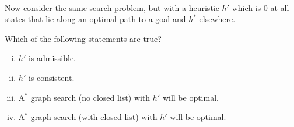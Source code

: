 \begin{enumerate}
\begin{enumerate}[(i)]
\fbox{\begin{minipage}[t][2.5cm][t]{13cm} \AnswerOneD \end{minipage}}\\
\end{enumerate}





Now consider the same search problem, but with a heuristic $h'$ which is 0 at all states that lie along an optimal path to a goal and $h^*$ elsewhere.


 Which of the following statements are true?\\
\begin{enumerate}[(i)]
\item $h'$ is admissible.\\
\item $h'$ is consistent.\\
\item A$^*$ graph search (no closed list) with $h'$ will be optimal.\\
\item A$^*$ graph search (with closed list) with $h'$ will be optimal.\\
\fbox{\begin{minipage}[t][2.5cm][t]{13cm} \AnswerOneE \end{minipage}}\\
\end{enumerate}

\end{enumerate}
